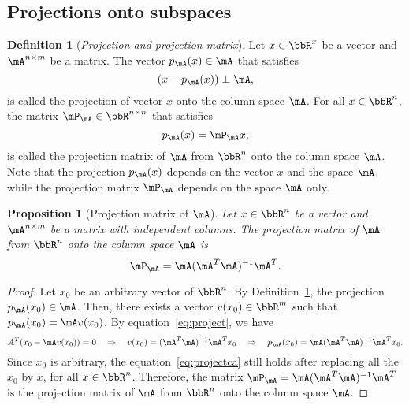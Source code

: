 \documentclass[11pt]{article}
\theoremstyle{plain}
\newtheorem{prop}{Proposition}
\theoremstyle{definition}
\newtheorem{defn}{Definition}
\begin{document}
\subsection{Projections onto subspaces}
\begin{defn}[\textit{Projection and projection matrix}]\label{def:project} Let  $x \in \bbR^{x}$ be a vector and $\mA^{n \times m}$ be a matrix. The vector $p_{\mA}(x) \in \mA$ that satisfies
	\begin{equation}\label{eq:project}
		(x-p_{\mA}(x)) \perp \mA,
	\end{equation} 
	is called the projection of vector $x$ onto the column space $\mA$. For all $x \in \bbR^n$, the matrix  $\mP_{\mA} \in \bbR^{n \times n}$  that satisfies	\begin{equation}
		p_{\mA}(x) =\mP_{\mA} x,
	\end{equation}
	is called the projection matrix of $\mA$ from $\bbR^n$ onto the column space $\mA$. Note that the projection $p_{\mA}(x)$ depends on the vector $x$ and the space $\mA$, while the projection matrix $\mP_{\mA}$ depends on the space $\mA$ only. 
\end{defn}

\begin{prop}[Projection matrix of $\mA$]\label{prop:project}
	Let  $x \in \bbR^{n}$ be a vector and $\mA^{n \times m}$ be a matrix with independent columns. The projection matrix of $\mA$ from $\bbR^n$ onto the column space  $\mA$ is 
	\begin{equation}
		\mP_{\mA} =  \mA (\mA^T \mA)^{-1} \mA^T.
	\end{equation}
\end{prop}

\begin{proof}
Let $x_0$ be an arbitrary vector of $\bbR^n$. By Definition~\ref{def:project}, the projection $p_{\mA}(x_0) \in \mA$. Then, there exists a vector $v(x_0) \in \bbR^m$ such that $p_{\mA}(x_0) = \mA  v(x_0)$.  By equation~\eqref{eq:project}, we have 
\begin{equation}\label{eq:projectca}
	A^T (x_0 - \mA v(x_0)) = 0 \quad \Rightarrow  \quad v(x_0) = (\mA^T \mA)^{-1} \mA^T x_0 \quad \Rightarrow \quad p_{\mA}(x_0)  = \mA (\mA^T \mA)^{-1} \mA^T  x_0. 
\end{equation}
Since $x_0$ is arbitrary, the equation~\eqref{eq:projectca} still holds after replacing all the $x_0$ by $x$, for all $x \in \bbR^n$. Therefore, the matrix $\mP_{\mA} =  \mA (\mA^T \mA)^{-1} \mA^T$ is the projection matrix of $\mA$ from $\bbR^n$ onto the column space $\mA$.
\end{proof}
 
\end{document}
